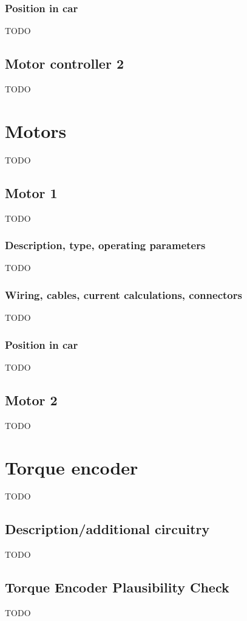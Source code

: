 \documentclass{article}
\begin{document}
\subsubsection{Position in car}
TODO

\subsection{Motor controller 2}
TODO

\section{Motors}
TODO

\subsection{Motor 1}
TODO

\subsubsection{Description, type, operating parameters}
TODO

\subsubsection{Wiring, cables, current calculations, connectors}
TODO

\subsubsection{Position in car}
TODO

\subsection{Motor 2}
TODO

\section{Torque encoder}
TODO

\subsection{Description/additional circuitry}
TODO

\subsection{Torque Encoder Plausibility Check}
TODO
\end{document}
